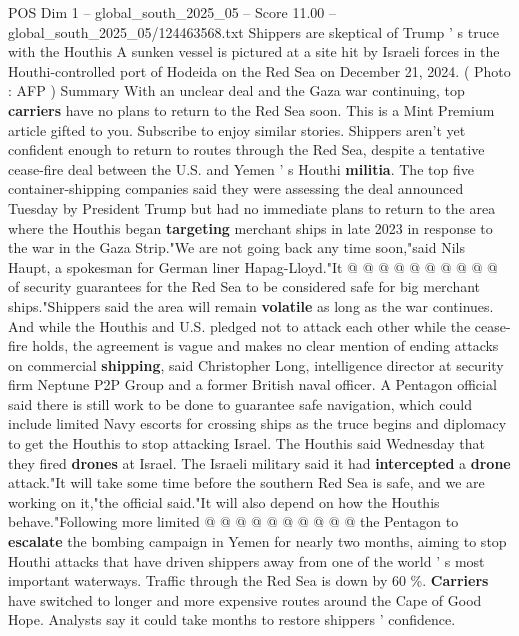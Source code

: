 \begin{textsample}{POS Dim 1 – global\_south\_2025\_05 – Score 11.00 – global\_south\_2025\_05/124463568.txt}  \label{ex:f1_pos_289}
Shippers are skeptical of Trump ' s truce with the Houthis A sunken vessel is pictured at a site hit by Israeli forces in the Houthi-controlled port of Hodeida on the Red Sea on December 21, 2024. ( Photo : AFP ) Summary With an unclear deal and the Gaza war continuing, top \textbf{carriers} have no plans to return to the Red Sea soon.
This is a Mint Premium article gifted to you.
Subscribe to enjoy similar stories.
Shippers aren't yet confident enough to return to routes through the Red Sea, despite a tentative cease-fire deal between the U.S. and Yemen ' s Houthi \textbf{militia}.
The top five container-shipping companies said they were assessing the deal announced Tuesday by President Trump but had no immediate plans to return to the area where the Houthis began \textbf{targeting} merchant ships in late 2023 in response to the war in the Gaza Strip."We are not going back any time soon,"said Nils Haupt, a spokesman for German liner Hapag-Lloyd."It @ @ @ @ @ @ @ @ @ @ of security guarantees for the Red Sea to be considered safe for big merchant ships."Shippers said the area will remain \textbf{volatile} as long as the war continues.
And while the Houthis and U.S. pledged not to attack each other while the cease-fire holds, the agreement is vague and makes no clear mention of ending attacks on commercial \textbf{shipping}, said Christopher Long, intelligence director at security firm Neptune P2P Group and a former British naval officer.
A Pentagon official said there is still work to be done to guarantee safe navigation, which could include limited Navy escorts for crossing ships as the truce begins and diplomacy to get the Houthis to stop attacking Israel.
The Houthis said Wednesday that they fired \textbf{drones} at Israel.
The Israeli military said it had \textbf{intercepted} a \textbf{drone} attack."It will take some time before the southern Red Sea is safe, and we are working on it,"the official said."It will also depend on how the Houthis behave."Following more limited @ @ @ @ @ @ @ @ @ @ the Pentagon to \textbf{escalate} the bombing campaign in Yemen for nearly two months, aiming to stop Houthi attacks that have driven shippers away from one of the world ' s most important waterways.
Traffic through the Red Sea is down by 60 \%. \textbf{Carriers} have switched to longer and more expensive routes around the Cape of Good Hope.
Analysts say it could take months to restore shippers ' confidence.

\end{textsample}

